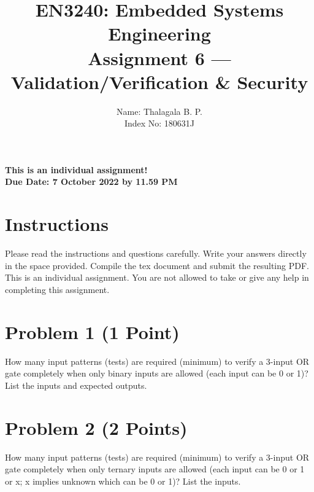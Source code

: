 \documentclass[11pt,letterpaper]{article}
\begin{document}
	
	\title{EN3240: Embedded Systems Engineering \\Assignment 6 --- Validation/Verification \& Security}
	
	\author{Name: Thalagala B. P. \\ Index No: 180631J}
	
	\maketitle
	
	\begin{center}
		\color{red}\bf This is an individual assignment! \\ Due Date: 7 October 2022 by 11.59 PM
	\end{center}
	
	\section*{Instructions}
	
	Please read the instructions and questions carefully. Write your answers directly in the space provided. Compile the tex document and submit the resulting PDF. This is an individual assignment. You are not allowed to take or give any help in completing this assignment.
	
	\newpage
	
	\section*{Problem 1 (1 Point)}
	
	How many input patterns (tests) are required (minimum) to verify a 3-input OR gate completely when only binary inputs are allowed (each input can be 0 or 1)? List the inputs and expected outputs.
	
	
	\vspace{50mm}
	
	
	\section*{Problem 2 (2 Points)}
	
	How many input patterns (tests) are required (minimum) to verify a 3-input OR gate completely when only ternary inputs are allowed (each input can be 0 or 1 or x;  x implies unknown which can be 0 or 1)? List the inputs.
	
\end{document}
